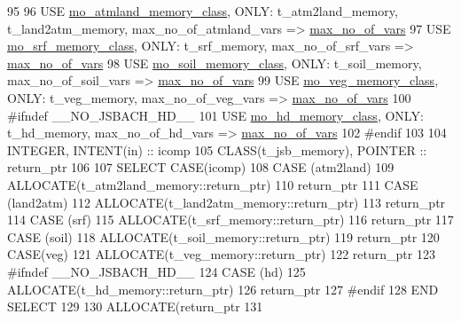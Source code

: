\begin{DoxyCode}
95 
96     \textcolor{keywordtype}{USE }\hyperlink{namespacemo__atmland__memory__class}{mo\_atmland\_memory\_class}\textcolor{keywordtype}{, ONLY}: t\_atm2land\_memory, t\_land2atm\_memory, 
      max\_no\_of\_atmland\_vars => \hyperlink{namespacemo__atmland__memory__class_afae3263e73e4c64ed0955c7ac81cd609}{max\_no\_of\_vars}
97     \textcolor{keywordtype}{USE }\hyperlink{namespacemo__srf__memory__class}{mo\_srf\_memory\_class}\textcolor{keywordtype}{,     ONLY}: t\_srf\_memory, max\_no\_of\_srf\_vars => 
      \hyperlink{namespacemo__atmland__memory__class_afae3263e73e4c64ed0955c7ac81cd609}{max\_no\_of\_vars}
98     \textcolor{keywordtype}{USE }\hyperlink{namespacemo__soil__memory__class}{mo\_soil\_memory\_class}\textcolor{keywordtype}{,    ONLY}: t\_soil\_memory, max\_no\_of\_soil\_vars => 
      \hyperlink{namespacemo__atmland__memory__class_afae3263e73e4c64ed0955c7ac81cd609}{max\_no\_of\_vars}
99     \textcolor{keywordtype}{USE }\hyperlink{namespacemo__veg__memory__class}{mo\_veg\_memory\_class}\textcolor{keywordtype}{,     ONLY}: t\_veg\_memory, max\_no\_of\_veg\_vars => 
      \hyperlink{namespacemo__atmland__memory__class_afae3263e73e4c64ed0955c7ac81cd609}{max\_no\_of\_vars}
100 \textcolor{preprocessor}{#ifndef \_\_NO\_JSBACH\_HD\_\_}
101 \textcolor{preprocessor}{}    \textcolor{keywordtype}{USE }\hyperlink{namespacemo__hd__memory__class}{mo\_hd\_memory\_class}\textcolor{keywordtype}{,      ONLY}: t\_hd\_memory, max\_no\_of\_hd\_vars => 
      \hyperlink{namespacemo__atmland__memory__class_afae3263e73e4c64ed0955c7ac81cd609}{max\_no\_of\_vars}
102 \textcolor{preprocessor}{#endif}
103 \textcolor{preprocessor}{}
104     \textcolor{keywordtype}{INTEGER}, \textcolor{keywordtype}{INTENT(in)} :: icomp
105     \textcolor{keywordtype}{CLASS}(t\_jsb\_memory), \textcolor{keywordtype}{POINTER}   :: return\_ptr
106 
107     \textcolor{keywordflow}{SELECT CASE}(icomp)
108     \textcolor{keywordflow}{CASE} (atm2land)
109       \textcolor{keyword}{ALLOCATE}(t\_atm2land\_memory::return\_ptr)
110       return\_ptr%
111     \textcolor{keywordflow}{CASE} (land2atm)
112       \textcolor{keyword}{ALLOCATE}(t\_land2atm\_memory::return\_ptr)
113       return\_ptr%
114     \textcolor{keywordflow}{CASE} (srf)
115       \textcolor{keyword}{ALLOCATE}(t\_srf\_memory::return\_ptr)
116       return\_ptr%
117     \textcolor{keywordflow}{CASE} (soil)
118       \textcolor{keyword}{ALLOCATE}(t\_soil\_memory::return\_ptr)
119       return\_ptr%
120     \textcolor{keywordflow}{CASE}(veg)
121       \textcolor{keyword}{ALLOCATE}(t\_veg\_memory::return\_ptr)
122       return\_ptr%
123 \textcolor{preprocessor}{#ifndef \_\_NO\_JSBACH\_HD\_\_}
124 \textcolor{preprocessor}{}    \textcolor{keywordflow}{CASE} (hd)
125       \textcolor{keyword}{ALLOCATE}(t\_hd\_memory::return\_ptr)
126       return\_ptr%
127 \textcolor{preprocessor}{#endif}
128 \textcolor{preprocessor}{}\textcolor{keywordflow}{    END SELECT}
129 
130     \textcolor{keyword}{ALLOCATE}(return\_ptr%
131 
\end{DoxyCode}
